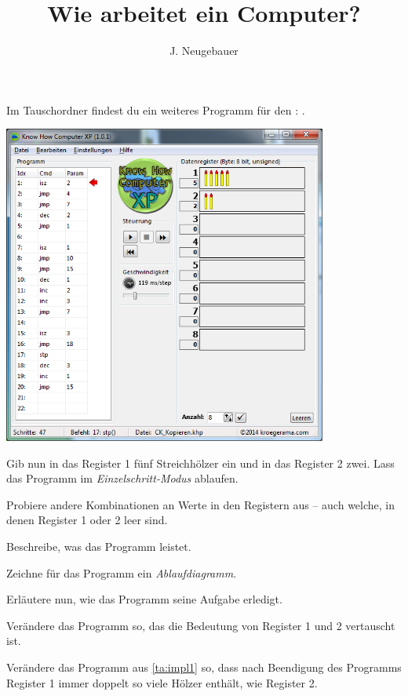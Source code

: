 \documentclass[10pt, a4paper]{scrartcl}
\author{J. Neugebauer}
\title{Wie arbeitet ein Computer?}
\date{\Heute}
\begin{document}
\ReiheTitel

\begin{aufgabe}[symbol=\symLaptop]
	Im Tauschordner findest du ein weiteres Programm für den : .
	
	\begin{center}
		\includegraphics[width=0.8\textwidth]{9Diff-AB.III.3-Abb-1}
	\end{center}
	
	\begin{teilaufgaben}
		\teilaufgabe Gib nun in das Register 1 fünf Streichhölzer ein und in das Register 2 zwei. Lass das Programm im \emph{Einzelschritt-Modus} ablaufen.
		
		\teilaufgabe Probiere andere Kombinationen an Werte in den Registern aus – auch welche, in denen Register 1 oder 2 leer sind.
		
		\teilaufgabe Beschreibe, was das Programm leistet.
		
		\teilaufgabe Zeichne für das Programm ein \emph{Ablaufdiagramm}.
		
		\teilaufgabe Erläutere nun, wie das Programm seine Aufgabe erledigt.
		
		
		\teilaufgabe\label{ta:impl1} Verändere das Programm so, das die Bedeutung von Register 1 und 2 vertauscht ist.
		
		\teilaufgabe\symStern\yspace Verändere das Programm aus \ref{ta:impl1} so, dass nach Beendigung des Programms Register 1 immer doppelt so viele Hölzer enthält, wie Register 2.
	\end{teilaufgaben}
\end{aufgabe}
\end{document}
